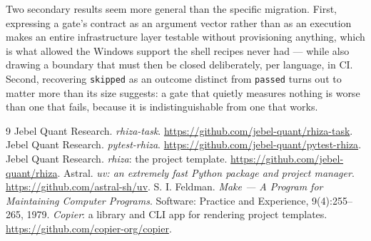 \documentclass[11pt,a4paper]{article}
\begin{document}
Two secondary results seem more general than the specific migration. First, expressing a
gate's contract as an argument vector rather than as an execution makes an entire
infrastructure layer testable without provisioning anything, which is what allowed the
Windows support the shell recipes never had --- while also drawing a boundary that must
then be closed deliberately, per language, in CI. Second, recovering \texttt{skipped} as an
outcome distinct from \texttt{passed} turns out to matter more than its size suggests: a
gate that quietly measures nothing is worse than one that fails, because it is
indistinguishable from one that works.

\begin{thebibliography}{9}
\small
{} Jebel Quant Research.
  \emph{rhiza-task}. \url{https://github.com/jebel-quant/rhiza-task}.
 Jebel Quant Research.
  \emph{pytest-rhiza}. \url{https://github.com/jebel-quant/pytest-rhiza}.
 Jebel Quant Research.
  \emph{rhiza}: the project template. \url{https://github.com/jebel-quant/rhiza}.
 Astral. \emph{uv: an extremely fast Python package and project manager}.
  \url{https://github.com/astral-sh/uv}.
 S. I. Feldman.
  \emph{Make --- A Program for Maintaining Computer Programs}.
  Software: Practice and Experience, 9(4):255--265, 1979.
 \emph{Copier}: a library and CLI app for rendering project templates.
  \url{https://github.com/copier-org/copier}.
\end{thebibliography}
\end{document}
